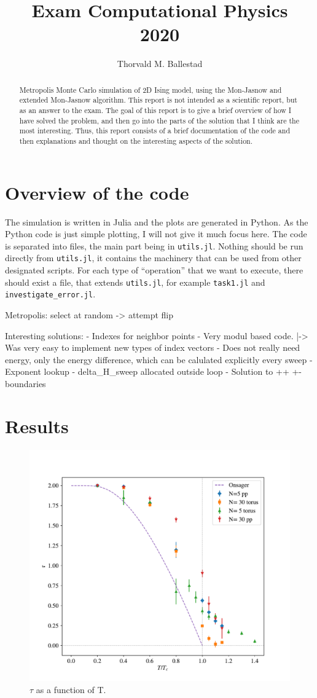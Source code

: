 \documentclass{article}
\title{Exam Computational Physics\\
  2020}
\author{Thorvald M. Ballestad}
\begin{document}
\maketitle
\begin{abstract}
  Metropolis Monte Carlo simulation of 2D Ising model, using the Mon-Jasnow and extended Mon-Jasnow algorithm.
  This report is not intended as a scientific report, but as an answer to the exam.
  The goal of this report is to give a brief overview of how I have solved the problem, and then go into the parts of the solution that I think are the most interesting.
  Thus, this report consists of a brief documentation of the code and then explanations and thought on the interesting aspects of the solution.
\end{abstract}

\section{Overview of the code}
The simulation is written in Julia and the plots are generated in Python.
As the Python code is just simple plotting, I will not give it much focus here.
The code is separated into files, the main part being in \verb|utils.jl|.
Nothing should be run directly from \verb|utils.jl|, it contains the machinery that can be used from other designated scripts.
For each type of ``operation'' that we want to execute, there should exist a file, that extends \verb|utils.jl|, for example \verb|task1.jl| and \verb|investigate_error.jl|.


Metropolis: select at random -> attempt flip

Interesting solutions:
- Indexes for neighbor points
- Very modul based code.
  |-> Was very easy to implement new types of index vectors
- Does not really need energy, only the energy difference, which can be calulated explicitly every sweep
- Exponent lookup
- delta_H_sweep allocated outside loop
- Solution to ++ +- boundaries


\section{Results}


\begin{figure}[ht]
  \centering
  \includegraphics[width=.75\textwidth]{media/tau_T}
  \caption{$\tau$ as a function of T.\label{fig:tau_T}}
\end{figure}
\end{document}
